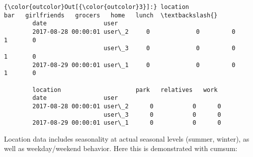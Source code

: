 \documentclass[11pt]{article}
\begin{document}
\begin{Verbatim}[commandchars=\\\{\}]
{\color{outcolor}Out[{\color{outcolor}3}]:} location                     bar   girlfriends   grocers   home   lunch  \textbackslash{}
        date                user                                                  
        2017-08-28 00:00:01 user\_2     0             0         0      1       0   
                            user\_3     0             0         0      1       0   
        2017-08-29 00:00:01 user\_1     0             0         0      1       0   
        
        location                     park   relatives   work  
        date                user                              
        2017-08-28 00:00:01 user\_2      0           0      0  
                            user\_3      0           0      0  
        2017-08-29 00:00:01 user\_1      0           0      0  
\end{Verbatim}
            
    Location data includes seasonality at actual seasonal levels (summer,
winter), as well as weekday/weekend behavior. Here this is demonstrated
with cumsum:
\end{document}
